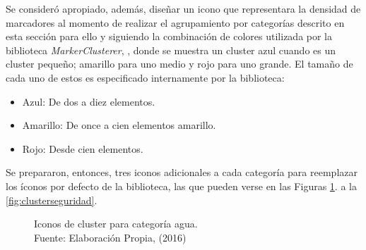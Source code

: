 Se consideró apropiado, además, diseñar un icono que representara la densidad de marcadores al momento de realizar el agrupamiento por categorías descrito en esta sección para ello y siguiendo la combinación de colores utilizada por la biblioteca \textit{MarkerClusterer}, \cite{MarkerClusterer}, donde se muestra un cluster azul cuando es un cluster pequeño; amarillo para uno medio y rojo para uno grande. El tamaño de cada uno de estos es especificado internamente por la biblioteca:

\begin{itemize}
\item Azul: De dos a diez elementos.
\item Amarillo: De once a cien elementos amarillo.
\item Rojo: Desde cien elementos.
\end{itemize}

Se prepararon, entonces, tres iconos adicionales a cada categoría para reemplazar los íconos por defecto de la biblioteca, las que pueden verse en las Figuras \ref{fig:clusterAgua}. a la \ref{fig:clusterseguridad}.

\begin{figure}[H]
\centering
{}\hfill
{}\hfill
{}
\caption[Iconos de cluster para categoría agua.]{Iconos de cluster para categoría agua.\\Fuente: Elaboración Propia, (2016)}
\label{fig:clusterAgua}
\end{figure}

